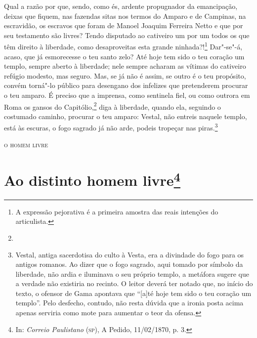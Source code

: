 \noindent{}Qual a razão por que, sendo, como és, ardente propugnador da
emancipação, deixas que fiquem, nas fazendas sitas nos termos do
Amparo e de
Campinas, na escravidão, os escravos que foram de Manoel Joaquim
Ferreira Netto e que por seu testamento são livres? Tendo disputado ao
cativeiro um por um todos os que têm direito à liberdade, como
desaproveitas esta grande ninhada?!\footnote{A expressão pejorativa é
  a primeira amostra das reais intenções do articulista.} Dar"-se"-á,
acaso, que já esmorecesse o teu santo zelo? Até hoje tem sido o teu
coração um templo, sempre aberto à liberdade; nele sempre acharam as
vítimas do cativeiro refúgio modesto, mas seguro. Mas, se já não é
assim, se outro é o teu propósito, convém torná"-lo público para
desengano dos infelizes que pretenderem procurar o teu amparo. É preciso
que a imprensa, como sentinela fiel, ou como outrora em Roma os gansos
do Capitólio,\footnote{} diga à liberdade,
quando ela, seguindo o costumado caminho, procurar o teu amparo: Vestal,
não entreis naquele templo, está às escuras, o fogo sagrado já não arde,
podeis tropeçar nas piras.\footnote{Vestal, antiga sacerdotisa do
  culto à Vesta, era a divindade do fogo para os antigos romanos. Ao
  dizer que o fogo sagrado, aqui tomado por símbolo da liberdade, não
  ardia e iluminava o seu próprio templo, a metáfora sugere que a
  verdade não existiria no recinto. O leitor deverá ter notado que, no
  início do texto, o ofensor de Gama apontava que ``{[}a{]}té hoje tem
  sido o teu coração um templo''. Pelo desfecho, contudo, não resta
  dúvida que a ironia posta acima apenas serviria como mote para
  aumentar o teor da ofensa.}

\hfill\textsc{o homem livre}



\chapter{Ao distinto homem livre\footnote[*]{In: \emph{Correio
  Paulistano} (\textsc{sp}), A Pedido, 11/02/1870, p. 3.}} %

